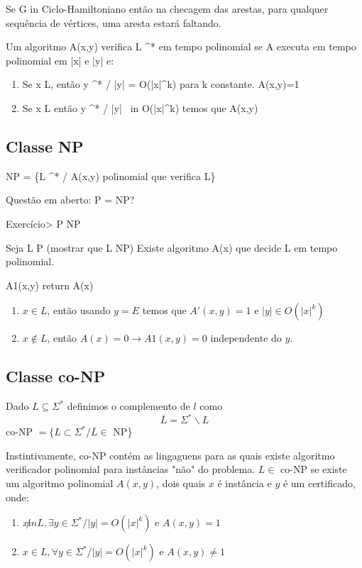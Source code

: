 \documentclass[a4paper,oneside,article,table]{article}
\begin{document}
            Se G \not in Ciclo-Hamiltoniano então na checagem das arestas, para qualquer sequência de vértices, uma aresta estará faltando.

            Um algoritmo A(x,y) verifica L \subseteq \Sigma^* em tempo polinomial se A executa em tempo polinomial em |x| e |y| e:
            \begin{enumerate}
                \item Se x \in L, então \exists y \in \Sigma^* / |y| = O(|x|^k) para k constante. A(x,y)=1
                \item Se x \notin L então \forall y \in \Sigma^* / |y| \ in O(|x|^k) temos que A(x,y) 

            \end{enumerate}

    \subsection{Classe NP}

        NP = \{L \subseteq \Sigma^* / \exists A(x,y) polinomial que verifica L\}

        Questão em aberto: P = NP?

        Exercício> P \subseteq NP

        Seja L \in P (mostrar que L \in NP) \arrowright Existe algoritmo A(x) que decide L em tempo polinomial.

        A1(x,y)
            return A(x)

        \begin{enumerate}
            \item $x \in L$, então usando $y = E$ temos que $A'(x,y) = 1$ e $|y| \in O(|x|^k)$
            \item $x \notin L$, então $A(x) = 0 \rightarrow A1(x,y) = 0$ independente do $y$.
        \end{enumerate}

    \subsection{Classe co-NP}

        Dado $L \subseteq \Sigma^*$ definimos o complemento de $l$ como
        \[\overline{L} = \Sigma^* \backslash L\]
        co-NP $= \{L \subset \Sigma^* / \overline{L} \in$ NP\}

        Instintivamente, co-NP contém as lingaguens para as quais existe algoritmo verificador polinomial para instâncias "não" do problema.
        $L \in $ co-NP se existe um algoritmo polinomial $A(x,y)$, dois quais $x$ é instância e $y$ é um certificado, onde:
        \begin{enumerate}
                \item $x \not in L, \exists y \in \Sigma^* / |y| = O(|x|^k)$ e $A(x,y) = 1$
                \item $x \in L, \forall y \in \Sigma^* / |y| = O(|x|^k)$ e $A(x,y) \neq 1$
        \end{enumerate}
\end{document}
